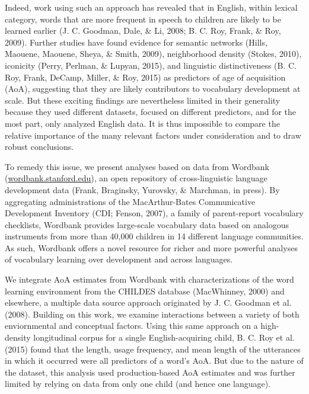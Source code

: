 \documentclass[10pt, letterpaper]{article}
\begin{document}
Indeed, work using such an approach has revealed that in English, within
lexical category, words that are more frequent in speech to children are
likely to be learned earlier (J. C. Goodman, Dale, \& Li, 2008; B. C.
Roy, Frank, \& Roy, 2009). Further studies have found evidence for
semantic networks (Hills, Maouene, Maouene, Sheya, \& Smith, 2009),
neighborhood density (Stokes, 2010), iconicity (Perry, Perlman, \&
Lupyan, 2015), and linguistic distinctiveness (B. C. Roy, Frank, DeCamp,
Miller, \& Roy, 2015) as predictors of age of acquisition (AoA),
suggesting that they are likely contributors to vocabulary development
at scale. But these exciting findings are nevertheless limited in their
generality because they used different datasets, focused on different
predictors, and for the most part, only analyzed English data. It is
thus impossible to compare the relative importance of the many relevant
factors under consideration and to draw robust conclusions.

To remedy this issue, we present analyses based on data from Wordbank
(\href{http://wordbank.stanford.edu}{wordbank.stanford.edu}), an open
repository of cross-linguistic language development data (Frank,
Braginsky, Yurovsky, \& Marchman, in press). By aggregating
administrations of the MacArthur-Bates Communicative Development
Inventory (CDI; Fenson, 2007), a family of parent-report vocabulary
checklists, Wordbank provides large-scale vocabulary data based on
analogous instruments from more than 40,000 children in 14 different
language communities. As such, Wordbank offers a novel resource for
richer and more powerful analyses of vocabulary learning over
development and across languages.

We integrate AoA estimates from Wordbank with characterizations of the
word learning environment from the CHILDES database (MacWhinney, 2000)
and elsewhere, a multiple data source approach originated by J. C.
Goodman et al. (2008). Building on this work, we examine interactions
between a variety of both enviornmental and conceptual factors. Using
this same approach on a high-density longitudinal corpus for a single
English-acquiring child, B. C. Roy et al. (2015) found that the length,
usage frequency, and mean length of the utterances in which it occurred
were all predictors of a word's AoA. But due to the nature of the
dataset, this analysis used production-based AoA estimates and was
further limited by relying on data from only one child (and hence one
language).
\end{document}
